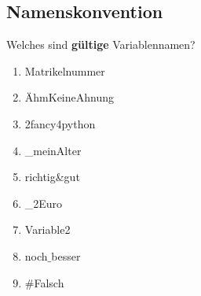 \subsection{Namenskonvention}
Welches sind \textbf{gültige} Variablennamen?
\begin{multicols}{3}
    \begin{enumerate}
        \item Matrikelnummer
        \item ÄhmKeineAhnung
        \item 2fancy4python
        \item {\_}meinAlter
        \item richtig\&gut
        \item {\_}2Euro
        \item Variable2
        \item noch$\_$besser
        \item \#Falsch
    \end{enumerate}
\end{multicols}
